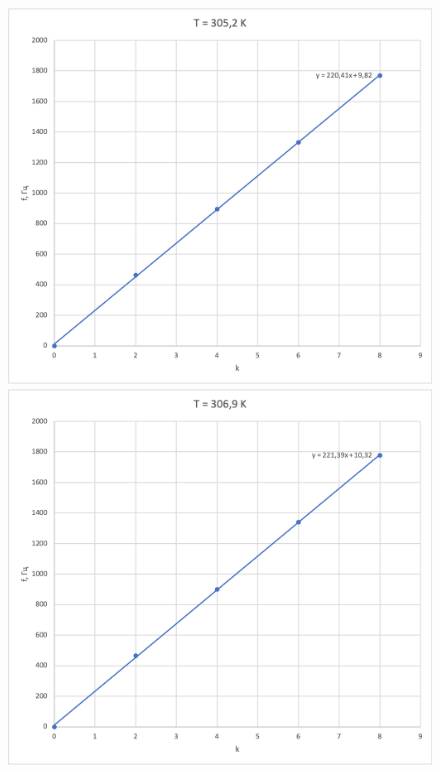 \documentclass[a4paper, 12pt]{article}
\begin{document}
\begin{enumerate}
\begin{figure}[ph]
\begin{minipage}[h]{0.5\linewidth}
            \end{minipage}
            \vfill
            \begin{minipage}[h]{0.5\linewidth}
                \includegraphics[width=1\linewidth]{5.png}
            \end{minipage}
            \hfill
            \begin{minipage}[h]{0.5\linewidth}
                \includegraphics[width=1\linewidth]{6.png}
            \end{minipage}
        \end{figure}
        

\end{enumerate}
\end{document}

